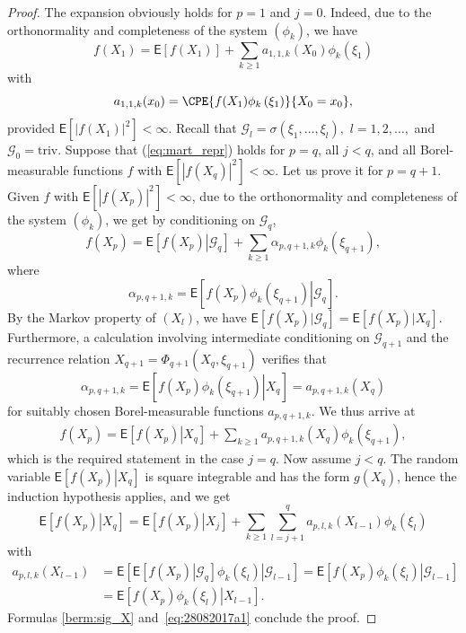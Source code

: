 \documentclass[article]{elsarticle}
\begin{document}
\begin{proof}
The expansion obviously holds for $p=1$ and $j=0$.
Indeed, due to the orthonormality and completeness
of the system $\left(\phi_{k}\right)$, we have
\[
f(X_{1})=\mathsf{E}\left[f(X_{1})\right]+\sum_{k\geq1}a_{1,1,k}(X_0)\phi_{k}(\xi_{1})
\]
with
\[
a_{1,1,k}(x_0)=\CPE{f(X_{1})\phi_{k}\left(\xi_{1}\right)}{X_0=x_0},
\]
provided $\mathsf{E}\left[\left|f(X_{1})\right|^{2}\right]<\infty.$
Recall that $\mathcal{G}_l=\sigma(\xi_{1},\ldots,\xi_{l}),$
$l=1,2,\ldots, $
and $\mathcal{G}_0=\mathrm{triv}$.
Suppose that (\ref{eq:mart_repr})
holds for $p=q$, all $j<q$, and all Borel-measurable functions
$f$ with $\mathsf{E}\left[|f(X_{q})|^2\right]<\infty$.
Let us prove it for $p=q+1$.
Given $f$ with $\mathsf{E}\left[|f(X_{p})|^2\right]<\infty$,
due to the orthonormality and completeness
of the system $\left(\phi_{k}\right)$, we get by
conditioning on $\mathcal{G}_{q}$,
\[
f(X_{p})=\mathsf{E}\left[\left.f(X_{p})\right|{\mathcal{G}}_q\right]+\sum_{k\geq1}\alpha_{p,q+1,k}\phi_{k}(\xi_{q+1}),
\]
where
\begin{equation*}
\alpha_{p,q+1,k}
=\mathsf{E}\left[\left.f(X_{p})\phi_{k}(\xi_{q+1})\right|\mathcal G_q\right].
\end{equation*}
By the Markov property of $(X_{l})$,
we have
$\mathsf{E}[f(X_{p})|\mathcal{G}_q]
=\mathsf{E}[f(X_{p})|X_{q}]$.
Furthermore, a calculation involving
intermediate conditioning on $\mathcal G_{q+1}$
and the recurrence relation
$X_{q+1}=\Phi_{q+1}(X_{q},\xi_{q+1})$
verifies that
\[
\alpha_{p,q+1,k}=\mathsf{E}\left[\left.f(X_{p})\phi_{k}(\xi_{q+1})\right|X_{q}\right]
=a_{p,q+1,k}(X_{q})
\]
for suitably chosen
Borel-measurable functions $a_{p,q+1,k}$.
We thus arrive at
\begin{align}
\label{berm:sig_X}
f(X_{p})=\mathsf{E}\left[\left.f(X_{p})\right|X_{q}\right]+\sum_{k\geq1}a_{p,q+1,k}(X_{q})\phi_{k}(\xi_{q+1}),
\end{align}
which is the required statement in the case $j=q$.
Now assume $j<q$.
The random variable
$\mathsf{E}\left[\left.f(X_{p})\right|X_{q}\right]$
is square integrable and has the form
$g(X_{q})$,
hence the induction hypothesis applies, and we get
\begin{equation}\label{eq:28082017a1}
\mathsf{E}\left[\left.f(X_{p})\right|X_{q}\right]=\mathsf{E}\left[\left.f(X_{p})\right|X_{j}\right]+\sum_{k\geq1}\sum_{l=j+1}^{q}a_{p,l,k}(X_{l-1})\phi_{k}(\xi_{l})
\end{equation}
with
\begin{align*}
a_{p,l,k}(X_{l-1}) &= \mathsf{E}\left[\left.\mathsf{E}\left[\left.f(X_{p})\right|\mathcal{G}_{q}\right]\phi_{k}(\xi_{l})\right|\mathcal{G}_{l-1}\right]
= \mathsf{E}\left[\left.f(X_{p})\phi_{k}(\xi_{l})\right|\mathcal{G}_{l-1}\right]\\
&=\mathsf{E}\left[\left.f(X_{p})\phi_{k}(\xi_{l})\right|X_{l-1}\right].
\end{align*}
Formulas \eqref{berm:sig_X}
and~\eqref{eq:28082017a1} conclude the proof.
\end{proof}
\end{document}
